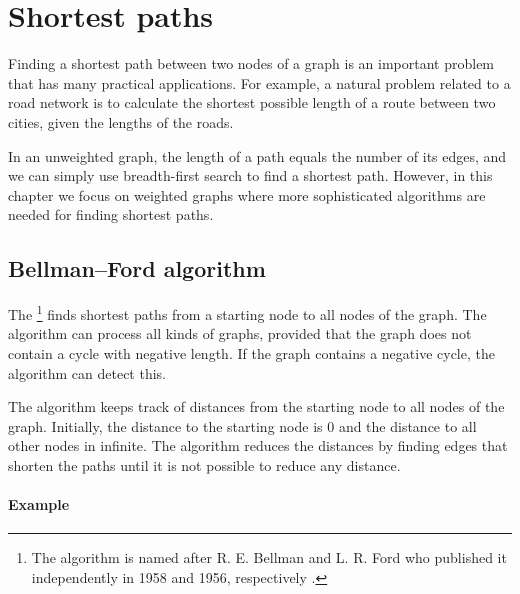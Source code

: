 \chapter{Shortest paths}


Finding a shortest path between two nodes
of a graph
is an important problem that has many
practical applications.
For example, a natural problem related to a road network
is to calculate the shortest possible length of a route
between two cities, given the lengths of the roads.

In an unweighted graph, the length of a path equals
the number of its edges, and we can
simply use breadth-first search to find
a shortest path.
However, in this chapter we focus on
weighted graphs
where more sophisticated algorithms
are needed
for finding shortest paths.

\section{Bellman–Ford algorithm}


The \footnote{The algorithm is named after
R. E. Bellman and L. R. Ford who published it independently
in 1958 and 1956, respectively \cite{bel58,for56a}.} finds
shortest paths from a starting node to all
nodes of the graph.
The algorithm can process all kinds of graphs,
provided that the graph does not contain a
cycle with negative length.
If the graph contains a negative cycle,
the algorithm can detect this.

The algorithm keeps track of distances
from the starting node to all nodes of the graph.
Initially, the distance to the starting node is 0
and the distance to all other nodes in infinite.
The algorithm reduces the distances by finding
edges that shorten the paths until it is not
possible to reduce any distance.

\subsubsection{Example}


